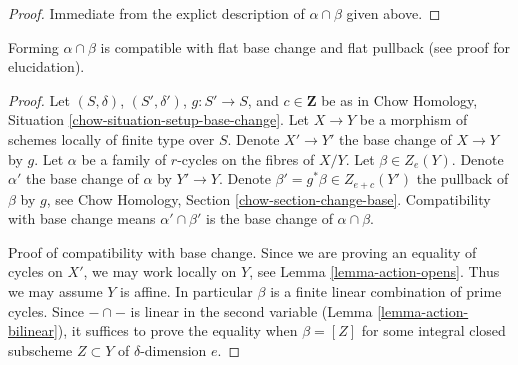\begin{proof}
Immediate from the explict description of $\alpha \cap \beta$
given above.
\end{proof}

\begin{lemma}
\label{lemma-action-base-change}
Forming $\alpha \cap \beta$ is compatible with flat base change
and flat pullback (see proof for elucidation).
\end{lemma}

\begin{proof}
Let $(S, \delta)$, $(S', \delta')$, $g : S' \to S$, and $c \in \mathbf{Z}$
be as in Chow Homology, Situation \ref{chow-situation-setup-base-change}.
Let $X \to Y$ be a morphism of schemes locally of finite type over $S$.
Denote $X' \to Y'$ the base change of $X \to Y$ by $g$.
Let $\alpha$ be a family of $r$-cycles on the fibres of $X/Y$.
Let $\beta \in Z_e(Y)$. Denote $\alpha'$ the
base change of $\alpha$ by $Y' \to Y$. Denote
$\beta' = g^*\beta \in Z_{e + c}(Y')$ the pullback of $\beta$ by $g$, see
Chow Homology, Section \ref{chow-section-change-base}.
Compatibility with base change means
$\alpha' \cap \beta'$ is the base change of $\alpha \cap \beta$.

\medskip\noindent
Proof of compatibility with base change.
Since we are proving an equality of cycles on $X'$, we may work locally
on $Y$, see Lemma \ref{lemma-action-opens}. Thus we may assume $Y$
is affine. In particular $\beta$ is a finite linear combination of prime
cycles. Since $- \cap -$ is linear in the second variable
(Lemma \ref{lemma-action-bilinear}), it suffices
to prove the equality when $\beta = [Z]$ for some integral closed subscheme
$Z \subset Y$ of $\delta$-dimension $e$.


\end{proof}
